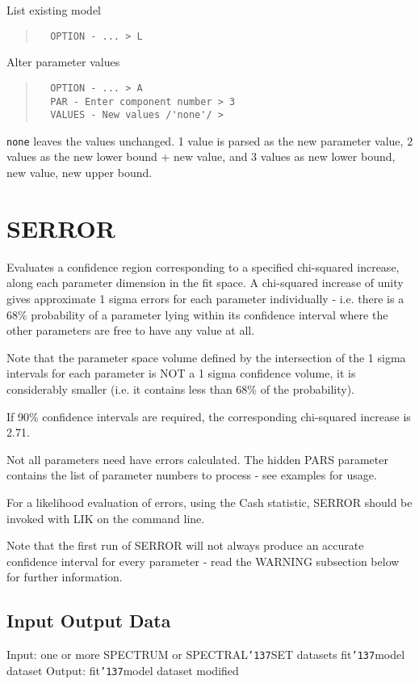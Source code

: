 \documentclass{book}
\renewcommand{\_}{{\tt\char'137}}     %
\begin{document}
List existing model
\begin{quote}\begin{verbatim}
  OPTION - ... > L
\end{verbatim}\end{quote}
Alter parameter values
\begin{quote}\begin{verbatim}
  OPTION - ... > A
  PAR - Enter component number > 3
  VALUES - New values /'none'/ >
\end{verbatim}\end{quote}
{\tt none} leaves the values unchanged. 1 value is parsed as the new
parameter value, 2 values as the new lower bound + new value, and
3 values as new lower bound, new value, new upper bound.

\section{SERROR}
Evaluates a confidence region corresponding to a specified
chi-squared increase, along each parameter dimension in the fit
space. A chi-squared increase of unity gives approximate 1 sigma
errors for each parameter individually - i.e. there is a 68\%
probability of a parameter lying within its confidence interval
where the other parameters are free to have any value at all.

Note that the parameter space volume defined by the intersection
of the 1 sigma intervals for each parameter is NOT a 1 sigma
confidence volume, it is considerably smaller (i.e. it contains
less than 68\% of the probability).

If 90\% confidence intervals are required, the corresponding
chi-squared increase is 2.71.

Not all parameters need have errors calculated. The hidden PARS
parameter contains the list of parameter numbers to process - see
examples for usage.

For a likelihood evaluation of errors, using the Cash statistic,
SERROR should be invoked with LIK on the command line.

Note that the first run of SERROR will not always produce an
accurate confidence interval for every parameter - read the
WARNING subsection below for further information.

\subsection{Input Output Data}
Input: one or more SPECTRUM or SPECTRAL\_SET datasets
fit\_model dataset
Output: fit\_model dataset modified
\end{document}
